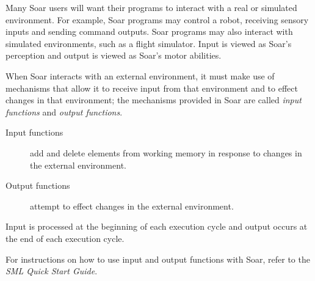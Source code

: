 Many Soar users will want their programs to interact with a real or simulated
environment. For example, Soar programs may control a robot, receiving sensory
inputs and sending command outputs. Soar programs may also interact with
simulated environments, such as a flight simulator. Input is viewed as
Soar's perception and output is viewed as Soar's motor abilities.

When Soar interacts with an external environment, it must make use of
mechanisms that allow it to receive input from that environment and to effect
changes in that environment; the mechanisms provided in Soar are called
\textit{input functions} and \textit{output functions}.

\begin{description}
\item[Input functions] add and delete elements from working memory in response
	to changes in the external environment.
\item[Output functions] attempt to effect changes in the external
	environment. 
\end{description}

Input is processed at the beginning of each execution cycle and output
occurs at the end of each execution cycle.

For instructions on how to use input and output functions with Soar, refer to the
\textit{SML Quick Start Guide}.




